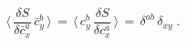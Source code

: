 \begin{equation}
  \label{ghDSEs}
  \langle \, \frac{\delta S}{\delta\bar c^a_x} \, \bar c^b_y\, \rangle \,
    =\, \langle \, c^b_y \,  \frac{\delta S}{\delta c^a_x} \, \rangle
    \,=\, \delta^{ab} \, \delta_{xy} \; .
\end{equation}

